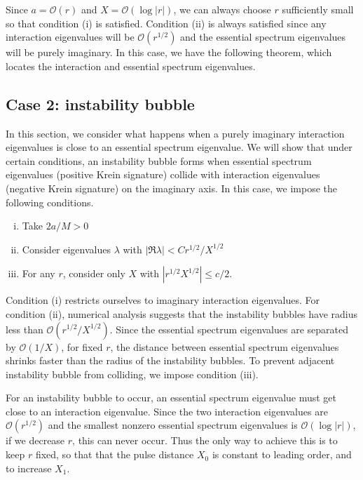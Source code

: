 \documentclass[thesis.tex]{subfiles}
\begin{document}
Since $a = \mathcal{O}(r)$ and $X = \mathcal{O}(\log|r|)$, we can always choose $r$ sufficiently small so that condition (i) is satisfied. Condition (ii) is always satisfied since any interaction eigenvalues will be $\mathcal{O}(r^{1/2})$ and the essential spectrum eigenvalues will be purely imaginary. In this case, we have the following theorem, which locates the interaction and essential spectrum eigenvalues.

\begin{theorem}\label{theorem:2peigscase1}
\end{theorem}

\subsection{Case 2: instability bubble}

In this section, we consider what happens when a purely imaginary interaction eigenvalues is close to an essential spectrum eigenvalue. We will show that under certain conditions, an instability bubble forms when essential spectrum eigenvalues (positive Krein signature) collide with interaction eigenvalues (negative Krein signature) on the imaginary axis. In this case, we impose the following conditions.

\begin{enumerate}[(i)]
	\item Take $2a/M > 0$
	\item Consider eigenvalues $\lambda$ with $|\Re \lambda| < C r^{1/2}/X^{1/2}$
	\item For any $r$, consider only $X$ with
	$\left| r^{1/2} X^{1/2} \right| \leq c/2$. 
	\end{enumerate}

Condition (i) restricts ourselves to imaginary interaction eigenvalues. For condition (ii), numerical analysis suggests that the instability bubbles have radius less than $\mathcal{O}(r^{1/2}/X^{1/2})$. Since the essential spectrum eigenvalues are separated by $\mathcal{O}(1/X)$, for fixed $r$, the distance between essential spectrum eigenvalues shrinks faster than the radius of the instability bubbles. To prevent adjacent instability bubble from colliding, we impose condition (iii).

For an instability bubble to occur, an essential spectrum eigenvalue must get close to an interaction eigenvalue. Since the two interaction eigenvalues are $\mathcal{O}(r^{1/2})$ and the smallest nonzero essential spectrum eigenvalues is $\mathcal{O}(\log|r|)$, if we decrease $r$, this can never occur. Thus the only way to achieve this is to keep $r$ fixed, so that that the pulse distance $X_0$ is constant to leading order, and to increase $X_1$.
\end{document}
